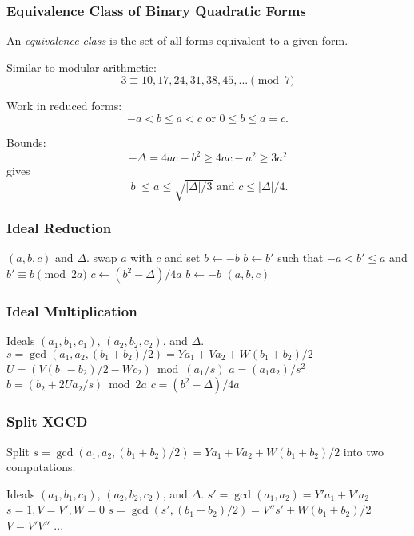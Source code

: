 \documentclass{beamer}
\begin{document}
\begin{frame}
\frametitle{Equivalence Class of Binary Quadratic Forms}
An \emph{equivalence class} is the set of all forms equivalent to a given form.

\bigbreak
Similar to modular arithmetic:
\[
3 \equiv 10, 17, 24, 31, 38, 45, ... \pmod 7
\]
\end{frame}

\begin{frame}
Work in reduced forms:
\[
-a < b \le a < c \textrm{ or } 0 \le b \le a = c.
\]

\bigbreak
Bounds:
\[
-\Delta = 4ac - b^2 \ge 4ac-a^2 \ge 3a^2
\]
gives
\[
|b| \le a \le \sqrt{|\Delta|/3} \textrm{ and } c \le |\Delta|/4.
\]
\end{frame}

\begin{frame}
\frametitle{Ideal Reduction}
\begin{algorithmic}[1]
\Require $(a, b, c)$ and $\Delta$.
		\State swap $a$ with $c$ and set $b \gets -b$
	\EndIf
		\State $b \gets b'$ such that $-a < b' \le a$ and $b' \equiv b \pmod{2a}$
		\State $c \gets (b^2-\Delta)/4a$
	\EndIf
\EndWhile
{}
	\State $b \gets -b$
\EndIf
\State \Return $(a, b, c)$
\end{algorithmic}
\end{frame}


\begin{frame}
\frametitle{Ideal Multiplication}
\begin{algorithmic}[1]
\Require Ideals $(a_1, b_1, c_1)$, $(a_2, b_2, c_2)$, and $\Delta$.
\State $s = \gcd(a_1, a_2, (b_1+b_2)/2) = Ya_1 + Va_2 + W(b_1+b_2)/2$
\State $U = (V(b_1-b_2)/2 - Wc_2) \bmod{(a_1/s)}$
\State $a = (a_1a_2)/s^2$
\State $b = (b_2 + 2Ua_2/s) \bmod{2a}$
\State $c = (b^2 - \Delta)/4a$
\end{algorithmic}
\end{frame}

\begin{frame}
\frametitle{Split XGCD}

Split $s = \gcd(a_1, a_2, (b_1+b_2)/2) = Ya_1 + Va_2 + W(b_1+b_2)/2$ into two computations.
\bigbreak

\begin{algorithmic}[1]
\Require Ideals $(a_1, b_1, c_1)$, $(a_2, b_2, c_2)$, and $\Delta$.
\State $s' = \gcd(a_1, a_2) = Y'a_1 + V'a_2$ 
\State $s = 1, V = V', W = 0$
\Else
\State $s = \gcd(s', (b_1 + b_2)/2) = V''s' + W(b_1 + b_2)/2$
\State $V = V'V''$ 
\EndIf
\State ...
\end{algorithmic}
\end{frame}
\end{document}

